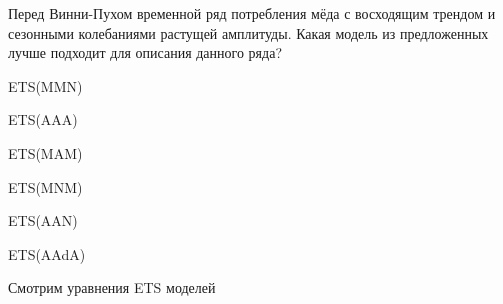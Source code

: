 
\begin{question}
Перед Винни-Пухом временной ряд потребления мёда с восходящим трендом и сезонными колебаниями растущей амплитуды.
Какая модель из предложенных лучше подходит для описания данного ряда?
\begin{answerlist}
  \item ETS(MMN)
  \item ETS(AAA)
  \item ETS(MAM)
  \item ETS(MNM)
  \item ETS(AAN)
  \item ETS(AAdA)
\end{answerlist}
\end{question}

\begin{solution}
Смотрим уравнения ETS моделей
\end{solution}

